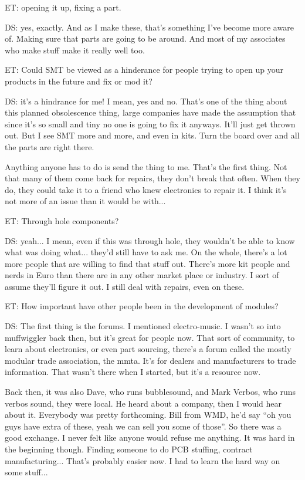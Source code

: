 ET: opening it up, fixing a part. 

DS: yes, exactly. And as I make these, that's something I've become more aware of. Making sure that parts are going to be around. And most of my associates who make stuff make it really well too. 

ET: Could SMT be viewed as a hinderance for people trying to open up your products in the future and fix or mod it? 

DS: it's a hindrance for me! I mean, yes and no. That's one of the thing about this planned obsolescence thing, large companies have made the assumption that since it's so small and tiny no one is going to fix it anyways. It'll just get thrown out. But I see SMT more and more, and even in kits. Turn the board over and all the parts are right there. 

Anything anyone has to do is send the thing to me. That's the first thing. Not that many of them come back for repairs, they don't break that often. When they do, they could take it to a friend who knew electronics to repair it. I think it's not more of an issue than it would be with... 

ET: Through hole components? 

DS: yeah... I mean, even if this was through hole, they wouldn't be able to know what was doing what... they'd still have to ask me. On the whole, there's a lot more people that are willing to find that stuff out. There's more kit people and nerds in Euro than there are in any other market place or industry. I sort of assume they'll figure it out. I still deal with repairs, even on these.

ET: How important have other people been in the development of modules? 

DS: The first thing is the forums. I mentioned electro-music. I wasn't so into muffwiggler back then, but it's great for people now. That sort of community, to learn about electronics, or even part sourcing, there's a forum called the mostly modular trade association, the mmta. It's for dealers and manufacturers to trade information. That wasn't there when I started, but it's a resource now. 

Back then, it was also Dave, who runs bubblesound, and Mark Verbos, who runs verbos sound, they were local. He heard about a company, then I would hear about it. Everybody was pretty forthcoming. Bill from WMD, he'd say ``oh you guys have extra of these, yeah we can sell you some of those''. So there was a good exchange. I never felt like anyone would refuse me anything. It was hard in the beginning though. Finding someone to do PCB stuffing, contract manufacturing... That's probably easier now. I had to learn the hard way on some stuff... 

